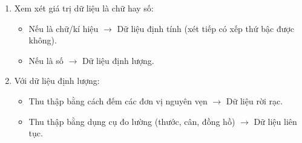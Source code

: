 \begin{enumerate}
\item Xem xét giá trị dữ liệu là chữ hay số:
\begin{itemize}
\item Nếu là chữ/kí hiệu $\rightarrow$ Dữ liệu định tính (xét tiếp có xếp thứ bậc được không).
\item Nếu là số $\rightarrow$ Dữ liệu định lượng.
\end{itemize}
\item Với dữ liệu định lượng:
\begin{itemize}
\item Thu thập bằng cách đếm các đơn vị nguyên vẹn $\rightarrow$ Dữ liệu rời rạc.
\item Thu thập bằng dụng cụ đo lường (thước, cân, đồng hồ) $\rightarrow$ Dữ liệu liên tục.
\end{itemize}
\end{enumerate}

